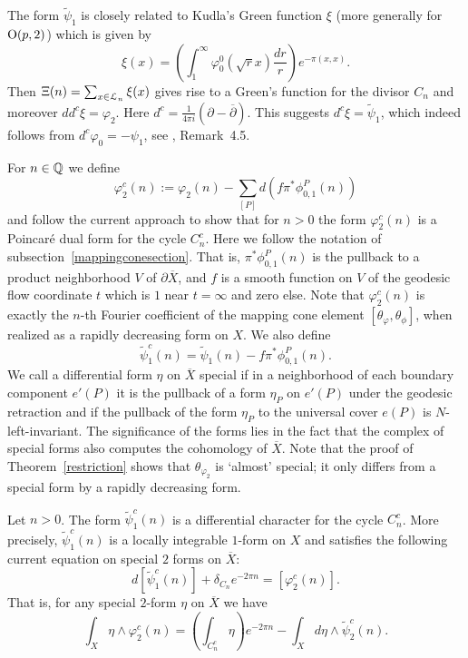 \begin{remark}\label{Kudla-xi}
The form $\tilde{\psi}_1$ is closely related to Kudla's Green function $\xi$ \cite{KAnn97,KBforms} (more generally for $\operatorname{O}(p,2)$) which is given by 
\[
\xi(x) =   \left( \int_1^{\infty} \varphi_0^0(\sqrt{r}x)  \frac{dr}{r} \right) e^{- \pi (x,x) }.
\]
Then $\Xi(n) = \sum_{x\in\mathcal{L}_n} \xi(x)$ gives rise to a Green's function for the divisor $C_n$ and moreover $dd^c \xi = \varphi_2$. Here $d^c = \tfrac{1}{4\pi i}(\partial - \overline{\partial})$. This suggests $d^c \xi = \tilde{\psi}_1$, which indeed follows from $d^c \varphi_0 = -\psi_1$, see \cite{BFDuke}, Remark~4.5. 
\end{remark}

For $n \in \mathbb{Q}$ we define
\[
 \varphi_2^c(n) :=  \varphi_2(n) - \sum_{[P]} d(f \pi^{\ast} \phi^P_{0,1}(n))
\]
and follow the current approach to show that for $n>0$ the form $\varphi_2^c(n)$
is a Poincar\'e dual form for the cycle $C_n^c$. Here we follow the notation of subsection~\ref{mappingconesection}. That is, $\pi^{\ast} \phi^P_{0,1}(n)$ is the pullback to a product neighborhood $V$ of $\partial \overline{X}$, and $f$ is a smooth function on $V$ of the geodesic flow coordinate $t$ which is $1$ near $t=\infty$ and zero else. Note that  $\varphi_2^c(n)$ is exactly the $n$-th Fourier coefficient of the mapping cone element $[\theta_{\varphi},\theta_{\phi}]$, when realized as a rapidly decreasing form on $X$. We also define 
\[
\tilde{\psi}_1^c(n) = \tilde{\psi}_1(n) - f \pi^{\ast} \phi^P_{0,1}(n). 
\]
We call a differential form $\eta$ on $\overline{X}$ special if in a neighborhood of each boundary component $e'(P)$ it is the pullback of a form $\eta_P$ on $e'(P)$ under the geodesic retraction and if the pullback of the form $\eta_P$ to the universal cover $e(P)$ is $N$-left-invariant. The significance of the forms lies in the fact that the complex of special forms also computes the cohomology of $\overline{X}$. Note that the proof of Theorem~\ref{restriction} shows that $\theta_{\varphi_2}$ is `almost' special; it only differs from a special form by a rapidly decreasing form. 




\begin{theorem}\label{newcurrenteq}
Let $n>0$. The form $ \tilde{\psi}_1^c(n)$ is a differential character for the cycle $C^c_n$. More precisely, $\tilde{\psi}_1^c(n)$ is a locally integrable $1$-form on $X$ and satisfies the following current equation on special $2$ forms on $\overline{X}$:
\[
d[\tilde{\psi}_1^c(n)] + \delta_{C_n}  e^{-2\pi n} = [\varphi_2^c(n)].
\]
That is, for any special $2$-form $\eta$ on $\overline{X}$ we have 
\[
\int_{X} \eta \wedge \varphi^c_{2}(n)  = \left(\int_{C^c_n}  \eta \right) e^{-2 \pi n} - \int_{X}  d\eta \wedge \tilde{\psi}^c_{2}(n).
\]
\end{theorem}

